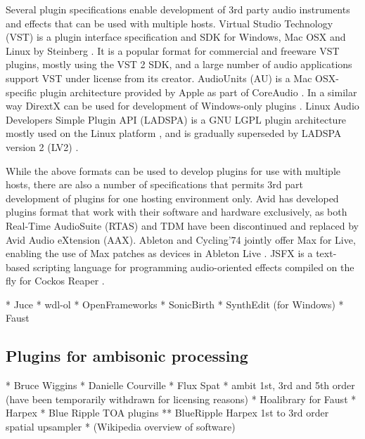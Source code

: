 \documentclass{article}
\begin{document}
Several plugin specifications enable development of 3rd party audio instruments and effects that can be used with multiple hosts.
Virtual Studio Technology (VST) is a plugin interface specification and SDK for Windows, Mac OSX and Linux by Steinberg \cite{steinberg:2014vst}.
It is a popular format for commercial and freeware VST plugins, mostly using the VST 2 SDK, and a large number of audio applications support VST under license from its creator.
AudioUnits (AU) is a Mac OSX-specific plugin architecture provided by Apple as part of CoreAudio \cite{apple2014:au}.
In a similar way DirextX can be used for development of Windows-only plugins \cite{microsoft2014:directX}.
Linux Audio Developers Simple Plugin API (LADSPA) is a GNU LGPL plugin architecture mostly used on the Linux platform \cite{furse:2007ladspa}, and is gradually superseded by LADSPA version 2 (LV2) \cite{lv2:2014}.

While the above formats can be used to develop plugins for use with multiple hosts, there are also a number of specifications that permits 3rd part development of plugins for one hosting environment only.
Avid has developed plugins format that work with their software and hardware exclusively, as both Real-Time AudioSuite (RTAS) and TDM have been discontinued and replaced by Avid Audio eXtension (AAX).
Ableton and Cycling'74 jointly offer Max for Live, enabling the use of Max patches as devices in Ableton Live \cite{ableton:2014maxforlive}. JSFX is a text-based scripting language for programming audio-oriented effects compiled on the fly for Cockos Reaper \cite{cockos:2014jsfx,cockos:2014reaper}.

* Juce
* wdl-ol
* OpenFrameworks
* SonicBirth
* SynthEdit (for Windows)
* Faust


\subsection{Plugins for ambisonic processing}\label{sec:ambi-plugins}


* Bruce Wiggins
* Danielle Courville
* Flux Spat
* ambit 1st, 3rd and 5th order (have been temporarily withdrawn for licensing reasons)
* Hoalibrary for Faust
* Harpex
* Blue Ripple TOA plugins
** BlueRipple Harpex 1st to 3rd order spatial upsampler
* (Wikipedia overview of software)




\end{document}
